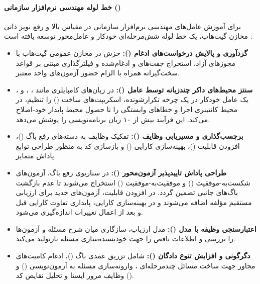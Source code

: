 \paragraph*{خط لوله مهندسی نرم‌افزار سازمانی ()}
برای آموزش عامل‌های مهندسی نرم‌افزار سازمانی در مقیاس بالا و رفع نویز ذاتی مخازن گیت‌هاب، یک خط لوله شش‌مرحله‌ای خودکار و عامل‌محور توسعه یافته است \cite{jimenez2024swe}:
\begin{itemize}
    \item \textbf{گردآوری و پالایش درخواست‌های ادغام ():} خزش در مخازن عمومی گیت‌هاب با مجوزهای آزاد، استخراج جفت‌های  و  ادغام‌شده و فیلترگذاری مبتنی بر قواعد سخت‌گیرانه همراه با الزام حضور آزمون‌های واحد معتبر.
    \item \textbf{سنتز محیط‌های داکر چندزبانه توسط عامل ():} در زبان‌های کامپایلری مانند ، ،  و ، یک عامل خودکار در یک چرخه تکرارشونده، اسکریپت‌های ساخت () را تنظیم، در محیط کانتینری اجرا و خطاهای وابستگی را تا حصول محیط پایدار خود-اصلاح می‌کند. این فرآیند بیش از ۱۰ زبان برنامه‌نویسی را پوشش می‌دهد.
    \item \textbf{برچسب‌گذاری و مسیریابی وظایف ():} تفکیک وظایف به دسته‌های رفع باگ ()، افزودن قابلیت ()، بهینه‌سازی کارایی () و بازسازی کد به منظور طراحی توابع پاداش متمایز.
    \item \textbf{طراحی پاداش تاییدپذیر آزمون‌محور ():} 
    در سناریوی رفع باگ، آزمون‌های شکست‌به-موفقیت () و موفقیت‌به-موفقیت () استخراج می‌شوند تا عدم بازگشت باگ‌های جانبی تضمین گردد. در افزودن قابلیت، آزمون‌های جدید برای ارزیابی مستقیم مؤلفه اضافه می‌شوند و در بهینه‌سازی کارایی، پایداری تفاوت کارایی قبل و بعد از اعمال تغییرات اندازه‌گیری می‌شود.
    \item \textbf{اعتبارسنجی وظیفه با مدل ():} مدل ارزیاب، سازگاری میان شرح مسئله و آزمون‌ها را بررسی و اطلاعات ناقص را جهت خودبسنده‌سازی مسئله بازتولید می‌کند.
    \item \textbf{دگرگونی و افزایش تنوع دادگان ():} شامل تزریق عمدی باگ ()، ادغام کامیت‌های مجاور جهت ساخت مسائل چندمرحله‌ای \cite{yang2024swesmith}، وارونه‌سازی مسئله به آزمون‌نویسی () و وظایف مرور ایستا و تحلیل نقایص کد ().
\end{itemize}

